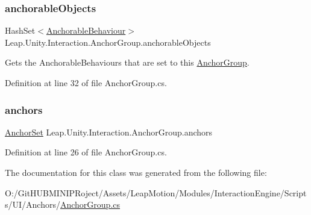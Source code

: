 \subsubsection{\texorpdfstring{anchorableObjects}{anchorableObjects}}
{\footnotesize\ttfamily Hash\+Set$<$\mbox{\hyperlink{class_leap_1_1_unity_1_1_interaction_1_1_anchorable_behaviour}{Anchorable\+Behaviour}}$>$ Leap.\+Unity.\+Interaction.\+Anchor\+Group.\+anchorable\+Objects\hspace{0.3cm}{\ttfamily [get]}}



Gets the Anchorable\+Behaviours that are set to this \mbox{\hyperlink{class_leap_1_1_unity_1_1_interaction_1_1_anchor_group}{Anchor\+Group}}. 



Definition at line 32 of file Anchor\+Group.\+cs.

\mbox{\label{class_leap_1_1_unity_1_1_interaction_1_1_anchor_group_a57bbc5ec4573e3c75a1716fa4650020c}} 
\subsubsection{\texorpdfstring{anchors}{anchors}}
{\footnotesize\ttfamily \mbox{\hyperlink{class_leap_1_1_unity_1_1_interaction_1_1_anchor_set}{Anchor\+Set}} Leap.\+Unity.\+Interaction.\+Anchor\+Group.\+anchors\hspace{0.3cm}{\ttfamily [get]}}



Definition at line 26 of file Anchor\+Group.\+cs.



The documentation for this class was generated from the following file\+:\begin{DoxyCompactItemize}
\item 
O\+:/\+Git\+H\+U\+B\+M\+I\+N\+I\+P\+Roject/\+Assets/\+Leap\+Motion/\+Modules/\+Interaction\+Engine/\+Scripts/\+U\+I/\+Anchors/\mbox{\hyperlink{_anchor_group_8cs}{Anchor\+Group.\+cs}}\end{DoxyCompactItemize}
